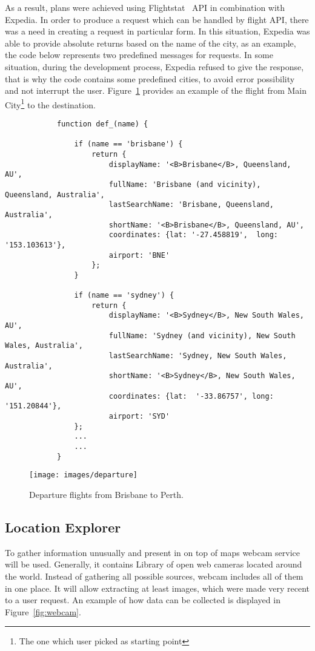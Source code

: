\documentclass[12pt]{article}
\numberwithin{equation}{section} %
\numberwithin{figure}{section} %
\numberwithin{table}{section} %
\begin{document}
		As a result, plans were achieved using Flightstat~\cite{noauthor_flightstats_nodate} API in combination with Expedia. In order to produce a request which can be handled by flight API, there was a need in creating a request in particular form. In this situation, Expedia was able to provide absolute returns based on the name of the city, as an example, the code below represents two predefined messages for requests. In some situation, during the development process, Expedia refused to give the response, that is why the code contains some predefined cities, to avoid error possibility and not interrupt the user. Figure~\ref{fig:depar} provides an example of the flight from Main City\footnote{The one which user picked as starting point} to the destination.
		
		\begin{lstlisting}
			function def_(name) {
			
				if (name == 'brisbane') {
					return {
						displayName: '<B>Brisbane</B>, Queensland, AU',
						fullName: 'Brisbane (and vicinity), Queensland, Australia',
						lastSearchName: 'Brisbane, Queensland, Australia',
						shortName: '<B>Brisbane</B>, Queensland, AU',
						coordinates: {lat: '-27.458819',  long: '153.103613'},
						airport: 'BNE'
					};
				}
				
				if (name == 'sydney') {
					return {
						displayName: '<B>Sydney</B>, New South Wales, AU',
						fullName: 'Sydney (and vicinity), New South Wales, Australia',
						lastSearchName: 'Sydney, New South Wales, Australia',
						shortName: '<B>Sydney</B>, New South Wales, AU',
						coordinates: {lat:  '-33.86757', long: '151.20844'},
						airport: 'SYD'
				};
				...
				...
			}
		\end{lstlisting}
		\begin{figure}[H]
			\centering        
			\texttt{[image: images/departure]}
			\caption{Departure flights from Brisbane to Perth.}
			\label{fig:depar}
		\end{figure}
	\subsection{Location Explorer}
		To gather information unusually and present in on top of maps webcam service will be used. Generally, it contains Library of open web cameras located around the world. Instead of gathering all possible sources, webcam includes all of them in one place. It will allow extracting at least images, which were made very recent to a user request. An example of how data can be collected is displayed in Figure~\ref{fig:webcam}. \\
		
\end{document}
